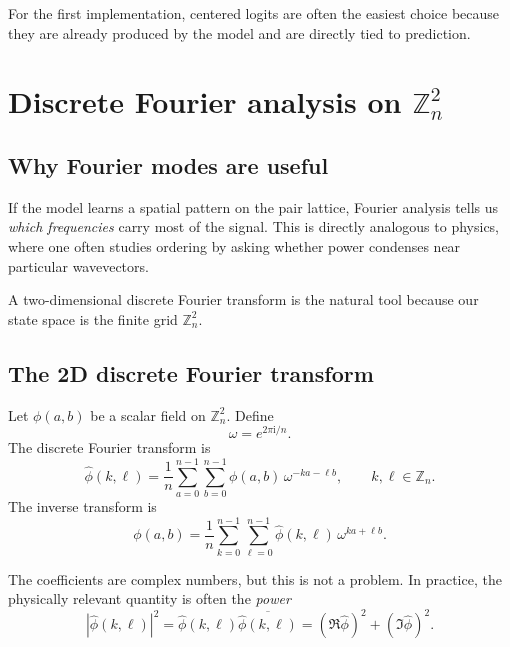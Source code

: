 \documentclass[11pt]{article}
\newcommand{\Zn}{\mathbb{Z}_n}
\newcommand{\ii}{\mathrm{i}}
\begin{document}
For the first implementation, centered logits are often the easiest choice because they are already produced by the model and are directly tied to prediction.

\section{Discrete Fourier analysis on $\Zn^2$}

\subsection{Why Fourier modes are useful}

If the model learns a spatial pattern on the pair lattice, Fourier analysis tells us \emph{which frequencies} carry most of the signal. This is directly analogous to physics, where one often studies ordering by asking whether power condenses near particular wavevectors.

A two-dimensional discrete Fourier transform is the natural tool because our state space is the finite grid $\Zn^2$.

\subsection{The 2D discrete Fourier transform}

Let $\phi(a,b)$ be a scalar field on $\Zn^2$. Define
\begin{equation}
    \omega = e^{2\pi \ii / n}.
\end{equation}
The discrete Fourier transform is
\begin{equation}
    \widehat{\phi}(k,\ell)
    = \frac{1}{n} \sum_{a=0}^{n-1} \sum_{b=0}^{n-1} \phi(a,b) \, \omega^{-ka-\ell b},
    \qquad k,\ell \in \Zn.
\end{equation}
The inverse transform is
\begin{equation}
    \phi(a,b)
    = \frac{1}{n} \sum_{k=0}^{n-1} \sum_{\ell=0}^{n-1} \widehat{\phi}(k,\ell) \, \omega^{ka+\ell b}.
\end{equation}

The coefficients are complex numbers, but this is not a problem. In practice, the physically relevant quantity is often the \emph{power}
\begin{equation}
    |\widehat{\phi}(k,\ell)|^2
    = \widehat{\phi}(k,\ell) \overline{\widehat{\phi}(k,\ell)}
    = (\Re \widehat{\phi})^2 + (\Im \widehat{\phi})^2.
\end{equation}
\end{document}
